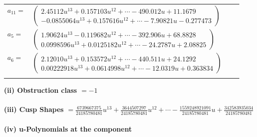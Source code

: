 \documentclass[1p]{elsarticle_modified}
\theoremstyle{definition}
\begin{document}
\begin{tabular}{m{7pt} m{180pt} m{7pt} m{180pt} }
\flushright $a_{11}=$&$\begin{pmatrix}2.45112 u^{13}+0.157103 u^{12}+\cdots-490.012 u+11.1679\\-0.0855064 u^{13}+0.157616 u^{12}+\cdots-7.90821 u-0.277473\end{pmatrix}$ \\
\flushright $a_{5}=$&$\begin{pmatrix}1.90624 u^{13}-0.119682 u^{12}+\cdots-392.906 u+68.8828\\0.0998596 u^{13}+0.0125182 u^{12}+\cdots-24.2787 u+2.08825\end{pmatrix}$ \\
\flushright $a_{6}=$&$\begin{pmatrix}2.12010 u^{13}+0.153572 u^{12}+\cdots-440.511 u+24.1292\\0.00222918 u^{13}+0.0614998 u^{12}+\cdots-12.0319 u+0.363834\end{pmatrix}$\\&\end{tabular}
\flushleft \textbf{(ii) Obstruction class $= -1$}\\~\\
\flushleft \textbf{(iii) Cusp Shapes $= \frac{6739667375}{24185780481} u^{13}+\frac{3644507297}{24185780481} u^{12}+\cdots-\frac{1559248921091}{24185780481} u+\frac{342583935034}{24185780481}$}\\~\\
\newpage\renewcommand{\arraystretch}{1}
\flushleft \textbf{(iv) u-Polynomials at the component}\newline \\
\end{document}

